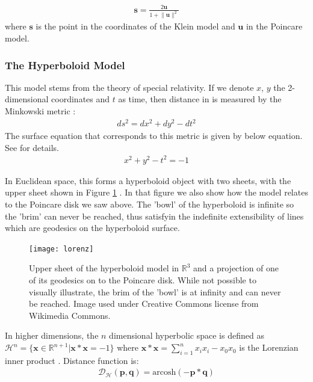 \documentclass[12pt]{report}
\begin{document}
\begin{align}
  \mathbf{s} = \frac{2\mathbf{u}}{1 + \lVert \mathbf{u} \rVert^2}
  \label{eq:pdist}
\end{align}
where $\mathbf{s}$ is the point in the coordinates of the Klein model and $\mathbf{u}$ in the Poincare model.



\subsubsection{The Hyperboloid Model}
This model stems from the theory of special relativity. If we denote $x$, $y$ the 2-dimensional coordinates and $t$ as time, then distance in is measured by the Minkowski metric \cite{Greenberg1994}:
\begin{align*}
  ds^2 = dx^2 + dy^2 - dt^2
\end{align*}
The surface equation that corresponds to this metric is given by below equation. See \cite{Greenberg1994} for details.
\begin{align*}
  x^2 + y^2 - t^2 = -1 
\end{align*}

In Euclidean space, this forms a hyperboloid object with two sheets, with the upper sheet shown in Figure \ref{fig:lorenz} \cite{Greenberg1994}. In that figure we also show how the model relates to the Poincare disk we saw above. The 'bowl' of the hyperboloid is infinite so the 'brim' can never be reached, thus satisfyin the indefinite extensibility of lines which are geodesics on the hyperboloid surface.

\begin{figure}
  \centering
	\texttt{[image: lorenz]}
	\caption{Upper sheet of the hyperboloid model in $\mathbb{R}^3$ and a projection of one of its geodesics on to the Poincare disk. While not possible to visually illustrate, the brim of the 'bowl' is at infinity and can never be reached. Image used under Creative Commons license from Wikimedia Commons.}
	\label{fig:lorenz}
\end{figure}

In higher dimensions, the $n$ dimensional hyperbolic space is defined as $\mathcal{H}^n = \{\mathbf{x} \in \mathbb{R}^{n+1} | \mathbf{x} * \mathbf{x}=-1 \}$ where $\mathbf{x} * \mathbf{x} = \sum_{i=1}^n x_i x_i - x_0 x_0$ is the Lorenzian inner product \cite{Nickel2018} \cite{Cannon}. Distance function is:
\begin{align}
  \mathcal{D_H(\mathbf{p}, \mathbf{q})} = \text{arcosh}(-\mathbf{p} * \mathbf{q})
\end{align}
\end{document}
